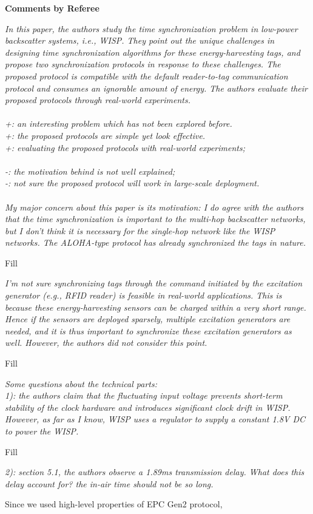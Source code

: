 \documentclass[10pt]{article}
\newcommand{\referee}[1]{
	{\item \color{OliveGreen} \emph{{#1}}}
	\label{R\therefereeCounter:\arabic{enumi}}
}
\newcommand{\response}[1]{{\color{blue} #1}}
\newcounter{refereeCounter}
\newenvironment{responses}{%
\refstepcounter{refereeCounter}%
\textbf{\large Comments by Referee \therefereeCounter}
\begin{enumerate}%
\renewcommand{\labelenumi}{\textbf{[R\therefereeCounter :\,\arabic{enumi}]}} %
}{\end{enumerate}}
\begin{document}
\begin{responses}
	
\referee{In this paper, the authors study the time synchronization problem in low-power backscatter systems, i.e., WISP. They point out the unique challenges in designing time synchronization algorithms for these energy-harvesting tags, and propose two synchronization protocols in response to these challenges. The proposed protocol is compatible with the default reader-to-tag communication protocol and consumes an ignorable amount of energy. The authors evaluate their proposed protocols through real-world experiments. \\
\\
+: an interesting problem which has not been explored before. \\
+: the proposed protocols are simple yet look effective. \\
+: evaluating the proposed protocols with real-world experiments; \\
\\		
-: the motivation behind is not well explained; \\
-: not sure the proposed protocol will work in large-scale deployment. \\
\\
My major concern about this paper is its motivation: I do agree with the authors that the time synchronization is important to the multi-hop backscatter networks, but I don’t think it is necessary for the single-hop network like the WISP networks. The ALOHA-type protocol has already synchronized the tags in nature. 
}
	
\response{
	Fill
}
	
\referee{I’m not sure synchronizing tags through the command initiated by the 
excitation generator (e.g., RFID reader) is feasible in real-world applications. This is because these energy-harvesting sensors can be charged within a very short range. Hence if the sensors are deployed sparsely, multiple excitation generators are needed, and it is thus important to synchronize these excitation generators as well. However, the authors did not consider this point.
}
	
\response{
	Fill
}
	
\referee{Some questions about the technical parts: \\
1): the authors claim that the fluctuating input voltage prevents short-term stability of the clock hardware and introduces significant clock drift in WISP. However, as far as I know, WISP uses a regulator to supply a constant 1.8V DC to power the WISP.}
	
\response{
	Fill
}
	
\referee{2): section 5.1, the authors observe a 1.89ms transmission delay. What does this delay account for? the in-air time should not be so long.
}
	
\response{
Since we used high-level properties of EPC Gen2 protocol, 
}
	
\end{responses}
\end{document}
